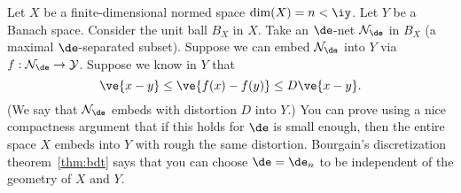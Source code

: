 Let $X$ be a finite-dimensional normed space $\dim(X)=n<\iy$. Let $Y$ be a Banach space.  Consider the unit ball $B_X$ in $X$. Take an $\de$-net $\cal N_\de$ in $B_X$ (a maximal $\de$-separated subset). Suppose we can embed $\cal N_\de$ into $Y$ via $f:\cal N_\de\to Y$. Suppose we know in $Y$ that
\[
\ve{x-y}\le \ve{f(x)-f(y)}\le D\ve{x-y}.
\] 
(We say that $\cal N_\de$ embeds with distortion $D$ into $Y$.)
You can prove using a nice compactness argument that if this holds for $\de$ is small enough, then the entire space $X$ embeds into $Y$ with rough the same distortion. %
Bourgain's discretization theorem~\ref{thm:bdt} says that you can choose $\de=\de_n$ to be independent of the geometry of $X$ and $Y$.

